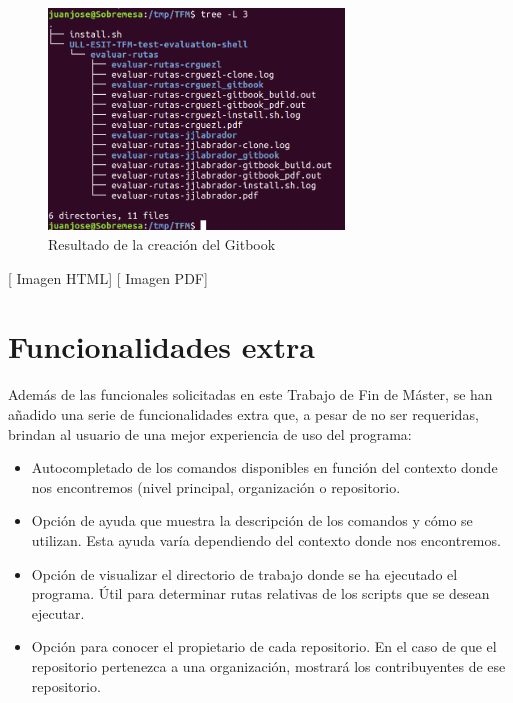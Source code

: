 		\begin{figure}[H]
		\begin{center}
		\includegraphics[width=0.7\textwidth]{images/ghshell8-2}
		\caption{Resultado de la creación del Gitbook}
		\label{fig:ghshell8-2}
		\end{center}
		\end{figure}
		
        		        		[ Imagen HTML]
        		        		        		[ Imagen PDF]
\newpage
\section{Funcionalidades extra}
\label{3:sec:2}

Además de las funcionales solicitadas en este Trabajo de Fin de Máster, se han añadido una serie de funcionalidades extra que, a pesar de no ser requeridas, brindan al usuario de una mejor experiencia de uso del programa:

\begin{itemize}
	\item Autocompletado de los comandos disponibles en función del contexto donde nos encontremos (nivel principal, organización o repositorio.
	\item Opción de ayuda que muestra la descripción de los comandos y cómo se utilizan. Esta ayuda varía dependiendo del contexto donde nos encontremos.
	\item Opción de visualizar el directorio de trabajo donde se ha ejecutado el programa. Útil para determinar rutas relativas de los scripts que se desean ejecutar.
	\item Opción para conocer el propietario de cada repositorio. En el caso de que el repositorio pertenezca a una organización, mostrará los contribuyentes de ese repositorio.
\end{itemize}


